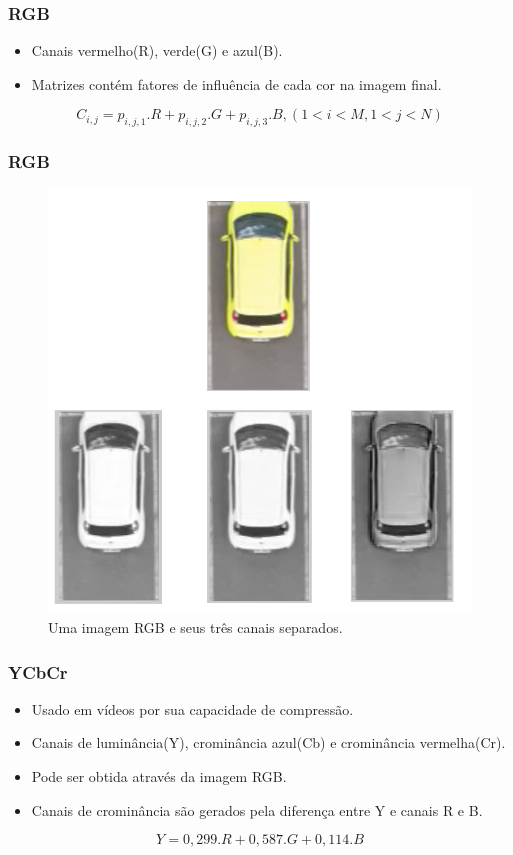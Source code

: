 \documentclass{beamer}
\begin{document}
\begin{frame}
\frametitle{RGB}
\begin{itemize}
  \item Canais vermelho(R), verde(G) e azul(B).
  \item Matrizes contém fatores de influência de cada cor na imagem final.
\end{itemize}

	\begin{equation}
			C_{i,j} = p_{i,j,1} . R + p_{i,j,2} . G + p_{i,j,3} . B ,  (1<i<M, 1<j<N)
	\label{eq:corRGB}
	\end{equation}

\end{frame}

\begin{frame}
\frametitle{RGB}

\begin{figure}
  \centering
  \includegraphics[width=.4\textwidth]{exemploRGBFinal}
  \caption{Uma imagem RGB e seus três canais separados.}
\end{figure}

\end{frame}

\begin{frame}
\frametitle{YCbCr}
\begin{itemize}
\item Usado em vídeos por sua capacidade de compressão.
\item Canais de luminância(Y), crominância azul(Cb) e crominância vermelha(Cr).
\item Pode ser obtida através da imagem RGB.
\item Canais de crominância são gerados pela diferença entre Y e canais R e B. 
\end{itemize}

\begin{equation}
	Y = 0,299.R + 0,587.G + 0,114.B
\label{eq:Y}
\end{equation}

\end{frame}
\end{document}
